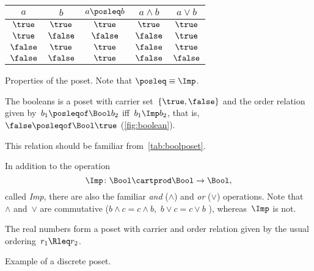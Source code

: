 \begin{margintable}
    \centering
    \begin{tabular}{cc|ccc}
        $a$      & $b$      & $a \posleq  b$ & $a \wedge b$ & $a \vee b$ \\ \hline
        $\true$  & $\true$  & $\true$        & $\true$      & $\true$    \\
        $\true$  & $\false$ & $\false$       & $\false$     & $\true$    \\
        $\false$ & $\true$  & $\true$        & $\false$     & $\true$    \\
        $\false$ & $\false$ & $\true$        & $\false$     & $\false$
    \end{tabular}
    \caption{Properties of the \Bool poset.
        Note that $\posleq \equiv \Imp$.
    }
    \label{tab:boolposet}
\end{margintable}

\begin{example}[Booleans]
    \label{ex:bool}
    The booleans \index{\Bool} is a poset with carrier set~$\{\true,\false\}$ and the order relation given by~$b_1 \posleqof\Bool b_2$ iff~$b_1 \Imp b_2$, that is,~$\false \posleqof\Bool \true$ (\cref{fig:boolean}).

    This relation should be familiar from~\cref{tab:boolposet}.

    In addition to the operation
    \begin{equation*}
        \Imp\colon\Bool\cartprod \Bool\to\Bool,
    \end{equation*}
    called \emph{Imp}, there are also the familiar \emph{and} ($\wedge$) and \emph{or} ($\vee$) operations.
    Note that~$\wedge$ and~$\vee$ are commutative ($b\wedge c = c\wedge b$,~$b\vee c = c\vee b$ ), whereas~$\Imp$ is not.
\end{example}


\begin{example}[Reals]
    The real numbers \reals form a poset with carrier \reals and order relation given by the usual ordering~$r_1 \Rleq r_2$.
\end{example}

\begin{marginfigure}
    \centering
    \caption{Example of a discrete poset.}
    \label{fig:discretepos}
\end{marginfigure}

